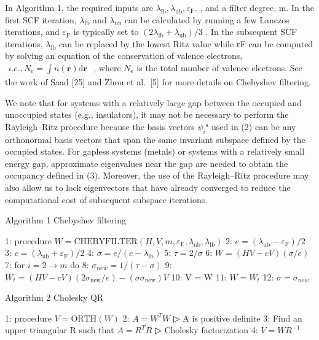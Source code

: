 \documentclass[
  10
]{article}
\begin{document}
In Algorithm 1, the required inputs are
\(\lambda _ { \mathrm { l b } } , \lambda _ { \mathrm { u b } } , \varepsilon _ { \mathrm { F } } .\)
, and a filter degree, m. In the first SCF iteration,
\(\lambda _ { \mathrm { l b } }\) and \(\lambda _ { \mathrm { u b } }\)
can be calculated by running a few Lanczos iterations, and
\(\varepsilon _ { \mathrm { F } }\) is typically set to
\(( 2 \lambda _ { \mathrm { l b } } + \lambda _ { \mathrm { u b } } ) / 3\)
. In the subsequent SCF iterations, \(\lambda _ { \mathrm { l b } }\)
can be replaced by the lowest Ritz value while εF can be computed by
solving an equation of the conservation of valence electrons,
\(\begin{array} { r } { i . e . , N _ { \mathrm { e } } = \int n ( \mathbf { r } ) \mathrm { d } \mathbf { r } } \end{array}\)
, where \(N _ { \mathrm { e } }\) is the total number of valence
electrons. See the work of Saad {[}25{]} and Zhou et al.~{[}5{]} for
more details on Chebyshev filtering.

We note that for systems with a relatively large gap between the
occupied and unoccupied states (e.g., insulators), it may not be
necessary to perform the Rayleigh--Ritz procedure because the basis
vectors \(\psi _ { i } \mathrm { ^ s }\) used in (2) can be any
orthonormal basis vectors that span the same invariant subspace defined
by the occupied states. For gapless systems (metals) or systems with a
relatively small energy gap, approximate eigenvalues near the gap are
needed to obtain the occupancy defined in (3). Moreover, the use of the
Rayleigh--Ritz procedure may also allow us to lock eigenvectors that
have already converged to reduce the computational cost of subsequent
subspace iterations.

Algorithm 1 Chebyshev filtering

1: procedure
\(W = \text{CHEBYFILTER}(H, V, m, \varepsilon_{\text{F}}, \lambda_{\text{ub}}, \lambda_{\text{lb}})\)
2: \(e = (\lambda_{\text{ub}} - \varepsilon_{\text{F}})/2\) 3:
\(c = (\lambda_{\text{ub}} + \varepsilon_{\text{F}})/2\) 4:
\(\sigma = e/(c - \lambda_{\text{lb}})\) 5: \(\tau = 2/\sigma\) 6:
\(W = (HV - cV)(\sigma/e)\) 7: for \(i = 2 \rightarrow m\) do 8:
\(\sigma_{new} = 1/(\tau - \sigma)\) 9:
\(W_t = (HV - cV)(2\sigma_{\text{new}}/e) - (\sigma\sigma_{\text{new}})V\)
10: V = W 11: \(W = W_t\) 12: \(\sigma = \sigma_{new}\)

Algorithm 2 Cholesky QR

1: procedure \(V = \text{ORTH}(W)\) 2: \(A = W^{T}W\) ▷ A is positive
definite 3: Find an upper triangular R such that \(A = R^{T}R\) ▷
Cholesky factorization 4: \(V = WR^{-1}\)
\end{document}
